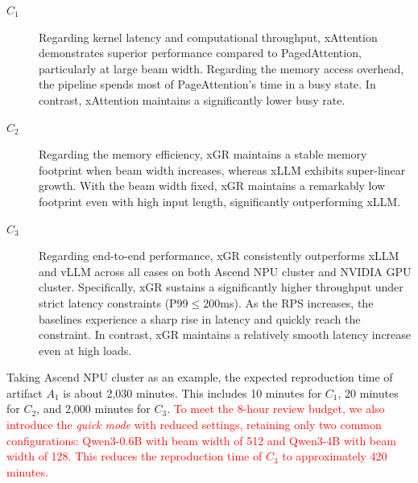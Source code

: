 \documentclass[conference]{IEEEtran}
\begin{document}
\begin{description}

\item[$C_1$] Regarding kernel latency and computational throughput, xAttention demonstrates superior performance compared to PagedAttention, particularly at large beam width. Regarding the memory access overhead, the pipeline spends most of PageAttention's time in a busy state. In contrast, xAttention maintains a significantly lower busy rate.

\item[$C_2$] Regarding the memory efficiency, xGR maintains a stable memory footprint when beam width increases, whereas xLLM exhibits super-linear growth. With the beam width fixed, xGR maintains a remarkably low footprint even with high input length, significantly outperforming xLLM.

\item[$C_3$] Regarding end-to-end performance, xGR consistently outperforms xLLM and vLLM across all cases on both Ascend NPU cluster and NVIDIA GPU cluster. Specifically, xGR sustains a significantly higher throughput under strict latency constraints (P99$\leq$200ms). As the RPS increases, the baselines experience a sharp rise in latency and quickly reach the constraint. In contrast, xGR maintains a relatively smooth latency increase even at high loads. 


\end{description}

%


\arttime


Taking  Ascend NPU cluster as an example, the expected reproduction time of artifact $A_1$ is about 2,030 minutes. This includes 10 minutes for $C_1$, 20 minutes for $C_2$, and 2,000 minutes for $C_3$. \textcolor{red}{To meet the 8-hour review budget, we also introduce the \textit{quick mode} with reduced settings, retaining only two common configurations: Qwen3-0.6B with beam width of 512 and Qwen3-4B with beam width of 128. This reduces the reproduction time of $C_3$ to approximately 420 minutes.}
\end{document}

